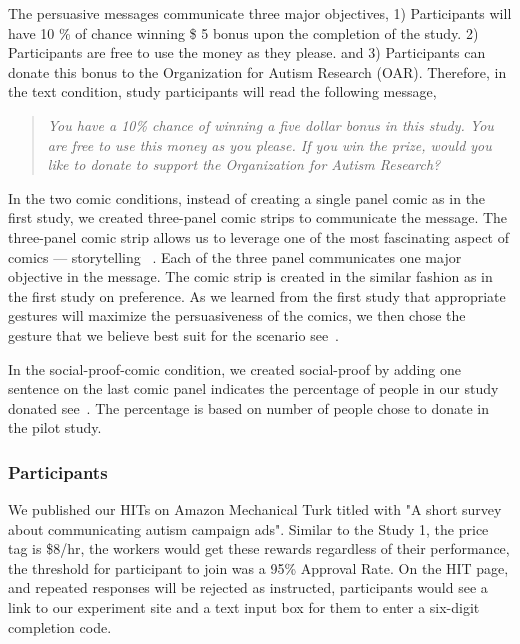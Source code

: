 The persuasive messages communicate three major objectives, 1) Participants will have 10 \% of chance winning \$ 5 bonus upon the completion of the study. 2) Participants are free to use the money as they please. and 3) Participants can donate this bonus to the Organization for Autism Research (OAR). Therefore, in the text condition, study participants will read the following message,
\begin{quote}
  \textit{You have a 10\% chance of winning a five dollar bonus in this study. You are free to use this money as you please. If you win the prize, would you like to donate to support the Organization for Autism Research?}
\end{quote}
In the two comic conditions, instead of creating a single panel comic as in the first study, we created three-panel comic strips to communicate the message. The three-panel comic strip allows us to leverage one of the most fascinating aspect of comics --- storytelling ~\cite{scott1993understanding}. Each of the three panel communicates one major objective in the message. The comic strip is created in the similar fashion as in the first study on preference. As we learned from the first study that appropriate gestures will maximize the persuasiveness of the comics, we then chose the gesture that we believe best suit for the scenario see~.

In the social-proof-comic condition, we created social-proof by adding one sentence on the last comic panel indicates the percentage of people in our study donated see~. The percentage is based on number of people chose to donate in the pilot study.


\subsubsection{Participants}
We published our HITs on Amazon Mechanical Turk titled with "A short survey about communicating autism campaign ads". Similar to the Study 1, the price tag is \$8/hr, the workers would get these rewards regardless of their performance, the threshold for participant to join was a 95\% Approval Rate. On the HIT page, and repeated responses will be rejected as instructed, participants would see a link to our experiment site and a text input box for them to enter a six-digit completion code.
